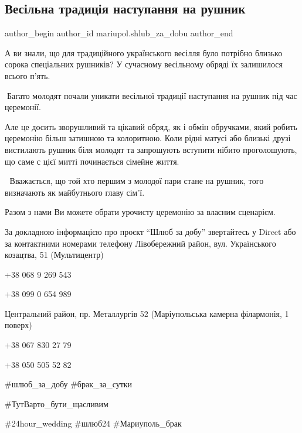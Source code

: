  
 
 
 
 

\subsection{Весільна традиція наступання на рушник}
\label{sec:12_02_2022.fb.mariupol.shlub_za_dobu.1.vesilna_tradicia_nastupannja_na_rushnyk}

\ifcmt
 author_begin
   author_id mariupol.shlub_za_dobu
 author_end
\fi

А ви знали, що для традиційного українського весілля було потрібно близько
сорока спеціальних рушників? У сучасному весільному обряді  їх залишилося
всього п'ять.

🤍Багато молодят почали уникати  весільної традиції наступання на рушник під
час церемонії. 

Але це досить зворушливий та цікавий обряд, як і обмін обручками, який робить
церемонію більш затишною та колоритною. Коли рідні матусі або близькі друзі
вистилають рушник біля молодят та запрошують вступити нібито проголошують, що
саме с цієї митті починається сімейне життя.

🤗 Вважається, що той хто першим з молодої пари стане на рушник, того
визначають як майбутнього главу сім'ї.

Разом з нами Ви можете обрати урочисту церемонію за власним сценарієм.

За докладною інформацією про проєкт \enquote{Шлюб за добу} звертайтесь у Direct
або за контактними номерами телефону Лівобережний район, вул. Українського
козацтва, 51 (Мультицентр)

+38 068 9 269 543\par
+38 099 0 654 989\par
Центральний район, пр. Металлургів 52 (Маріупольська камерна філармонія, 1 поверх)\par
+38 067 830 27 79 \par
+38 050 505 52 82\par

\#шлюб\_за\_добу \#брак\_за\_сутки

\#ТутВарто\_бути\_щасливим 

\#24hour\_wedding \#шлюб24 \#Мариуполь\_брак
